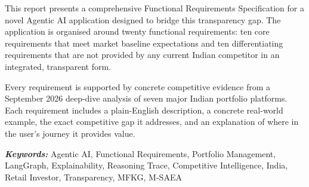 \documentclass[12pt, a4paper, openany, oneside]{report}
\providecommand{\keywords}[1]{\textbf{\textit{Keywords:}} #1}
\begin{document}
This report presents a comprehensive Functional Requirements Specification for a novel Agentic AI application designed to bridge this transparency gap. The application is organised around twenty functional requirements: ten core requirements that meet market baseline expectations and ten differentiating requirements that are not provided by any current Indian competitor in an integrated, transparent form.

Every requirement is supported by concrete competitive evidence from a September 2026 deep-dive analysis of seven major Indian portfolio platforms. Each requirement includes a plain-English description, a concrete real-world example, the exact competitive gap it addresses, and an explanation of where in the user's journey it provides value.

\vspace{0.8em}
\keywords{Agentic AI, Functional Requirements, Portfolio Management, LangGraph, Explainability, Reasoning Trace, Competitive Intelligence, India, Retail Investor, Transparency, MFKG, M-SAEA}

\clearpage
\newpage

\renewcommand*{\contentsname}{\MakeUppercase{Contents}}
\renewcommand*{\listtablename}{\MakeUppercase{List of Tables}}
\renewcommand{\bibname}{REFERENCES}
\thispagestyle{plain}
\setcounter{page}{1}
\tableofcontents
\cleardoublepage

\listoftables
{}
\cleardoublepage
\end{document}
